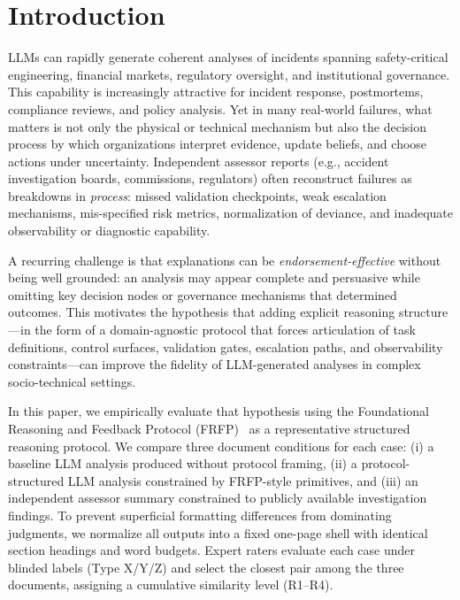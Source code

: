 
\section{Introduction}
\label{sec:intro}

LLMs can rapidly generate coherent analyses of incidents spanning safety-critical engineering, financial markets, regulatory oversight, and institutional governance. This capability is increasingly attractive for incident response, postmortems, compliance reviews, and policy analysis. Yet in many real-world failures, what matters is not only the physical or technical mechanism but also the decision process by which organizations interpret evidence, update beliefs, and choose actions under uncertainty. Independent assessor reports (e.g., accident investigation boards, commissions, regulators) often reconstruct failures as breakdowns in \emph{process}: missed validation checkpoints, weak escalation mechanisms, mis-specified risk metrics, normalization of deviance, and inadequate observability or diagnostic capability.

A recurring challenge is that explanations can be \emph{endorsement-effective} without being well grounded: an analysis may appear complete and persuasive while omitting key decision nodes or governance mechanisms that determined outcomes. This motivates the hypothesis that adding explicit reasoning structure---in the form of a domain-agnostic protocol that forces articulation of task definitions, control surfaces, validation gates, escalation paths, and observability constraints---can improve the fidelity of LLM-generated analyses in complex socio-technical settings.

In this paper, we empirically evaluate that hypothesis using the Foundational Reasoning and Feedback Protocol (FRFP)~\cite{frfp_vol1} as a representative structured reasoning protocol. We compare three document conditions for each case: (i) a baseline LLM analysis produced without protocol framing, (ii) a protocol-structured LLM analysis constrained by FRFP-style primitives, and (iii) an independent assessor summary constrained to publicly available investigation findings. To prevent superficial formatting differences from dominating judgments, we normalize all outputs into a fixed one-page shell with identical section headings and word budgets. Expert raters evaluate each case under blinded labels (Type X/Y/Z) and select the closest pair among the three documents, assigning a cumulative similarity level (R1--R4).


